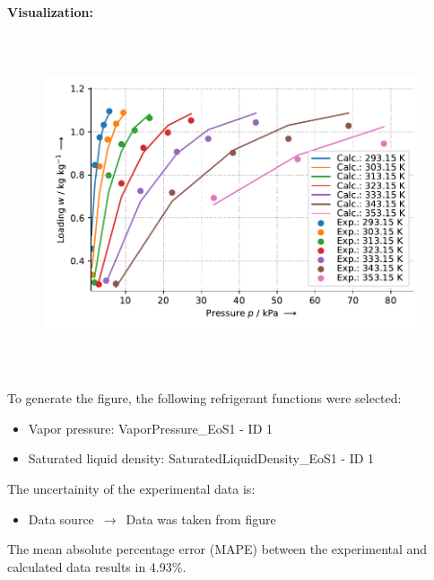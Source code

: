 \textbf{Visualization:}
%
\begin{figure}[!htp]
{\noindent\includegraphics[height=10cm, keepaspectratio]{figs/ads/ads_Ethanol_activated_carbon_powder_KOH-H2-treated_Maxsorb_III_DubininAstakhov_1.pdf}}
\end{figure}
%

To generate the figure, the following refrigerant functions were selected:
\begin{itemize}
\item Vapor pressure: VaporPressure\_EoS1 - ID 1
\item Saturated liquid density: SaturatedLiquidDensity\_EoS1 - ID 1
\end{itemize}

The uncertainity of the experimental data is:
\begin{itemize}
\item Data source $\,\to\,$ Data was taken from figure
\end{itemize}

The mean absolute percentage error (MAPE) between the experimental and calculated data results in 4.93\%.
\FloatBarrier
\newpage
